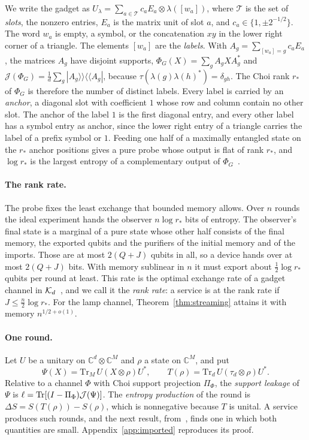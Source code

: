 We write the gadget as $U_\lambda=\sum_{a\in\mathcal T}c_aE_a\otimes\lambda([w_a])$, where $\mathcal T$ is the set of \emph{slots}, the nonzero
entries, $E_a$ is the matrix unit of slot $a$, and $c_a\in\{1,\pm2^{-1/2}\}$. The word $w_a$ is empty, a symbol, or the concatenation $xy$ in
the lower right corner of a triangle. The elements $[w_a]$ are the \emph{labels}. With $A_g=\sum_{[w_a]=g}c_aE_a$, the matrices $A_g$ have disjoint
supports, $\Phi_G(X)=\sum_gA_gXA_g^*$ and $\mathcal J(\Phi_G)=\frac1d\sum_g|A_g\rangle\!\rangle\langle\!\langle A_g|$, because
$\tau(\lambda(g)\lambda(h)^*)=\delta_{gh}$. The Choi rank $r_*$ of $\Phi_G$ is therefore the number of distinct labels. Every label is carried by an
\emph{anchor}, a diagonal slot with coefficient $1$ whose row and column contain no other slot. The anchor of the label $1$ is the first
diagonal entry, and every other label has a symbol entry as anchor, since the lower right entry of a triangle carries the label of a prefix
symbol or $1$. Feeding one half of a maximally entangled state on the $r_*$ anchor positions gives a pure probe whose output is flat of rank
$r_*$, and $\log r_*$ is the largest entropy of a complementary output of $\Phi_G$~\cite[Proposition~9.1]{DouglasMghirbiB}.

\paragraph{The rank rate.} The probe fixes the least exchange that bounded memory allows. Over $n$ rounds the ideal experiment hands the
observer $n\log r_*$ bits of entropy. The observer's final state is a marginal of a pure state whose other half consists of the final memory,
the exported qubits and the purifiers of the initial memory and of the imports. Those are at most $2(Q+J)$ qubits in all, so a device hands
over at most $2(Q+J)$ bits. With memory sublinear in $n$ it must export about $\frac12\log r_*$ qubits per round at least. This rate is the optimal
exchange rate of a gadget channel in $\mathcal K_d$~\cite[Propositions~3.1 and~9.1]{DouglasMghirbiB}, and we call it the \emph{rank rate}: a service is
at the rank rate if $J\le\frac n2\log r_*$. For the lamp channel, Theorem~\ref{thm:streaming} attains it with memory $n^{1/2+o(1)}$.

\paragraph{One round.} Let $U$ be a unitary on $\mathbb C^d\otimes\mathbb C^M$ and $\rho$ a state on $\mathbb C^M$, and put
\[
\Psi(X)=\mathrm{Tr}_M\,U(X\otimes\rho)U^*,\qquad T(\rho)=\mathrm{Tr}_d\,U(\tau_d\otimes\rho)U^* .
\]
Relative to a channel $\Phi$ with Choi support projection $\Pi_\Phi$, the \emph{support leakage} of $\Psi$ is
$\ell=\operatorname{Tr}[(I-\Pi_\Phi)\mathcal J(\Psi)]$. The \emph{entropy production} of the round is $\Delta S=S(T(\rho))-S(\rho)$, which is nonnegative because
$T$ is unital. A service produces such rounds, and the next result, from~\cite[Theorem~5.2]{DouglasMghirbiB}, finds one in which both quantities are
small. Appendix~\ref{app:imported} reproduces its proof.

